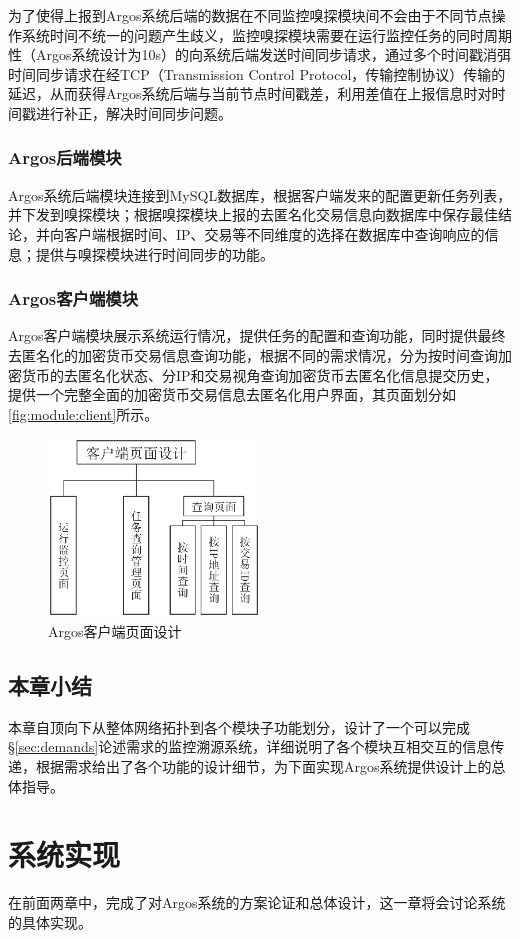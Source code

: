 \documentclass[supercite]{HustGraduPaper}
\newcommand{\xfig}[3]{
  \begin{figure}[htb]
    \centering
    #3
    \caption{#2}
    \label{fig:#1}
  \end{figure}
}
\newcommand{\rfig}[1]{\autoref{fig:#1}}
\theoremstyle{definition}
\begin{document}
为了使得上报到Argos系统后端的数据在不同监控嗅探模块间不会由于不同节点操作系统时间不统一的问题产生歧义，监控嗅探模块需要在运行监控任务的同时周期性（Argos系统设计为10s）的向系统后端发送时间同步请求，通过多个时间戳消弭时间同步请求在经TCP（Transmission Control Protocol，传输控制协议）传输的延迟，从而获得Argos系统后端与当前节点时间戳差，利用差值在上报信息时对时间戳进行补正，解决时间同步问题。
\subsubsection{Argos后端模块}
Argos系统后端模块连接到MySQL数据库，根据客户端发来的配置更新任务列表，并下发到嗅探模块；根据嗅探模块上报的去匿名化交易信息向数据库中保存最佳结论，并向客户端根据时间、IP、交易等不同维度的选择在数据库中查询响应的信息；提供与嗅探模块进行时间同步的功能。


\subsubsection{Argos客户端模块}
Argos客户端模块展示系统运行情况，提供任务的配置和查询功能，同时提供最终去匿名化的加密货币交易信息查询功能，根据不同的需求情况，分为按时间查询加密货币的去匿名化状态、分IP和交易视角查询加密货币去匿名化信息提交历史，提供一个完整全面的加密货币交易信息去匿名化用户界面，其页面划分如\rfig{module:client}所示。

\xfig{module:client}{Argos客户端页面设计}{
  \includegraphics[width=0.5\textwidth]{images/3.3-client.ps}
}

\subsection{本章小结}
本章自顶向下从整体网络拓扑到各个模块子功能划分，设计了一个可以完成\S \ref{sec:demands}论述需求的监控溯源系统，详细说明了各个模块互相交互的信息传递，根据需求给出了各个功能的设计细节，为下面实现Argos系统提供设计上的总体指导。
\newpage


\section{系统实现}
在前面两章中，完成了对Argos系统的方案论证和总体设计，这一章将会讨论系统的具体实现。
\end{document}
